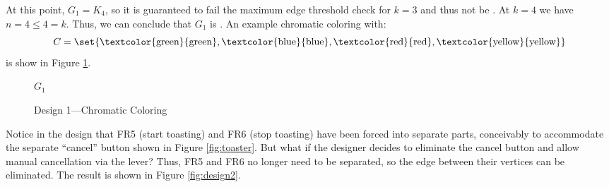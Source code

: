 At this point, \(G_1=K_4\), so it is guaranteed to fail the maximum edge threshold check for \(k=3\) and thus not
be .  At \(k=4\) we have \(n=4\le4=k\).  Thus, we can conclude that \(G_1\) is . An
example chromatic coloring with:
\[C=\set{\text{\textcolor{green}{green}},\text{\textcolor{blue}{blue}},\text{\textcolor{red}{red}},
  \text{\textcolor{yellow}{yellow}}}\]
is show in Figure \ref{fig:d1color}.

\begin{figure}[h]
  \label{fig:d1color}
  \begin{center}

    \bigskip

    \(G_1\)
  \end{center}
  \caption{Design 1---Chromatic Coloring}
\end{figure}

Notice in the design that FR5 (start toasting) and FR6 (stop toasting) have been forced into separate parts,
conceivably to accommodate the separate ``cancel'' button shown in Figure \ref{fig:toaster}.  But what if the
designer decides to eliminate the cancel button and allow manual cancellation via the lever?  Thus, FR5 and FR6
no longer need to be separated, so the edge between their vertices can be eliminated.  The result is shown in Figure
\ref{fig:design2}.

